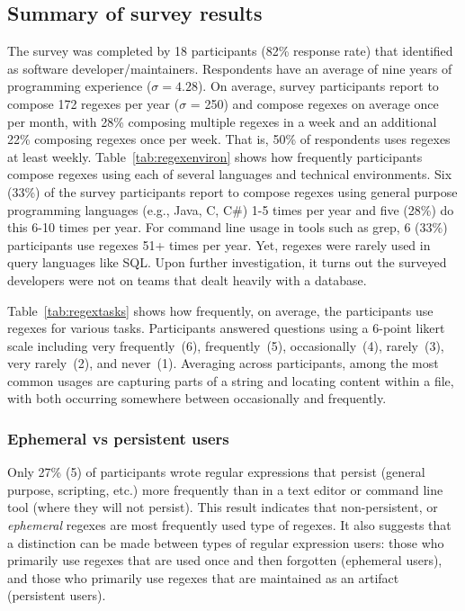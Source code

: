 \subsection{Summary of survey results}


The survey was completed by 18 participants (82\% response rate) that identified as software developer/maintainers.
Respondents have an average of nine years of programming experience ($\sigma = 4.28$).
On average, survey participants report to compose 172 regexes per year ($\sigma$ = 250) and compose regexes on average once per month, with 28\% composing multiple regexes in a week and an additional 22\% composing regexes once per week. That is, 50\% of respondents uses regexes at least weekly.
Table~\ref{tab:regexenviron} shows how frequently participants compose regexes using each of several languages and technical environments.
Six (33\%) of the survey participants report to compose regexes using general purpose programming languages (e.g., Java, C, C\#) 1-5 times per year and five (28\%) do this 6-10 times per year.  For command line usage in tools such as grep, 6 (33\%) participants use regexes 51+ times per year. Yet, regexes were rarely used in query languages like SQL. Upon further investigation, it turns out the surveyed developers were not on teams that dealt heavily with a database.





Table~\ref{tab:regextasks} shows how frequently, on average, the participants use
regexes for various tasks.
Participants answered questions using a 6-point likert scale including very frequently~(6), frequently~(5), occasionally~(4), rarely~(3), very rarely~(2), and never~(1).
Averaging across participants, among the most common usages are capturing parts of a string and locating content within a file, with both occurring somewhere between occasionally and frequently.


\subsubsection{Ephemeral vs persistent users}
Only 27\% (5)
of participants wrote regular expressions that persist (general purpose, scripting, etc.) more frequently than in a text editor or command line tool (where they will not persist).  This result indicates that non-persistent, or \emph{ephemeral} regexes are most frequently used type of regexes.  It also suggests that a distinction can be made between types of regular expression users: those who primarily use regexes that are used once and then forgotten (ephemeral users), and those who primarily use regexes that are maintained as an artifact (persistent users).

